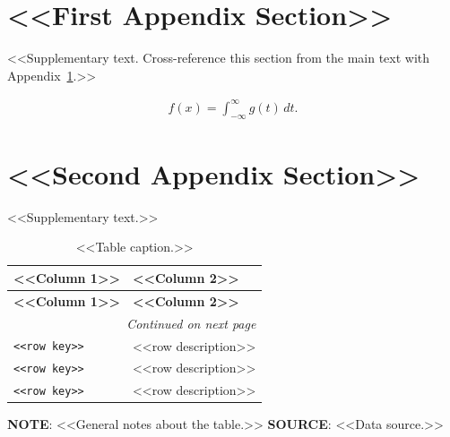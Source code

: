 
\setcounter{secnumdepth}{1}
\setcounter{equation}{0}
\setcounter{figure}{0}
\setcounter{table}{0}
\setcounter{section}{0}

\renewcommand{\theequation}{S\arabic{equation}}
\renewcommand{\thefigure}{S\arabic{figure}}
\renewcommand{\thesection}{S\arabic{section}}
\renewcommand{\thetable}{S\arabic{table}}

\section{<<First Appendix Section>>} \label{app:one}

<<Supplementary text. Cross-reference this section from the main text with Appendix~\ref{app:one}.>>

\begin{align*}
    f(x) = \int_{-\infty}^{\infty} g(t)\,dt.
\end{align*}

\newpage

\section{<<Second Appendix Section>>} \label{app:two}

<<Supplementary text.>>

\setlength{\tabcolsep}{4pt}          %
\renewcommand{\arraystretch}{1.0}    %
\setlength{\LTpost}{0pt}             %

\begin{longtable}{@{} l p{} @{}}
    \caption{<<Table caption.>>} \label{app:tab:example} \\
    \toprule
    \textbf{<<Column 1>>} & \textbf{<<Column 2>>} \\
    \midrule
    \endfirsthead
    \toprule
    \textbf{<<Column 1>>} & \textbf{<<Column 2>>} \\
    \midrule
    \endhead
    \midrule \multicolumn{2}{r}{\textit{Continued on next page}} \\
    \midrule
    \endfoot
    \bottomrule
    \endlastfoot

    \texttt{<<row key>>} & \small <<row description>> \\
    \texttt{<<row key>>} & \small <<row description>> \\
    \texttt{<<row key>>} & \small <<row description>> \\
\end{longtable}

\footnotesize
\noindent
\textbf{NOTE}: <<General notes about the table.>>\newline
\textbf{SOURCE}: <<Data source.>>
